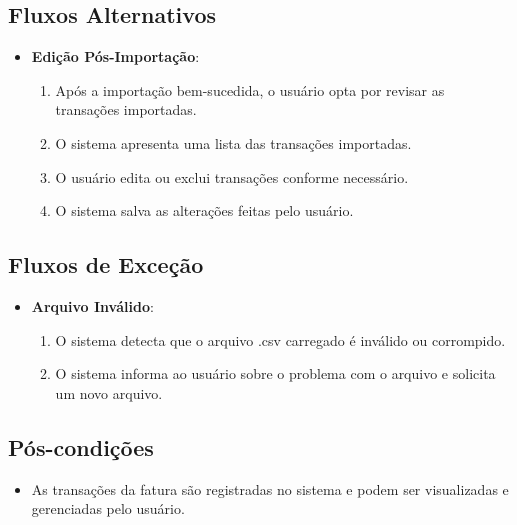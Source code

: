 \subsection*{Fluxos Alternativos}
\begin{addmargin}[1.5cm]{0cm}
	\begin{itemize}
		\item \textbf{Edição Pós-Importação}:
		      \begin{enumerate}
			      \item Após a importação bem-sucedida, o usuário opta por revisar as transações importadas.
			      \item O sistema apresenta uma lista das transações importadas.
			      \item O usuário edita ou exclui transações conforme necessário.
			      \item O sistema salva as alterações feitas pelo usuário.
		      \end{enumerate}
	\end{itemize}
\end{addmargin}

\subsection*{Fluxos de Exceção}
\begin{addmargin}[1.5cm]{0cm}
	\begin{itemize}
		\item \textbf{Arquivo Inválido}:
		      \begin{enumerate}
			      \item O sistema detecta que o arquivo .csv carregado é inválido ou corrompido.
			      \item O sistema informa ao usuário sobre o problema com o arquivo e solicita um novo arquivo.
		      \end{enumerate}
	\end{itemize}
\end{addmargin}

\subsection*{Pós-condições}
\begin{addmargin}[1.5cm]{0cm}
	\begin{itemize}
		\item As transações da fatura são registradas no sistema e podem ser visualizadas e gerenciadas pelo usuário.
	\end{itemize}
\end{addmargin}

